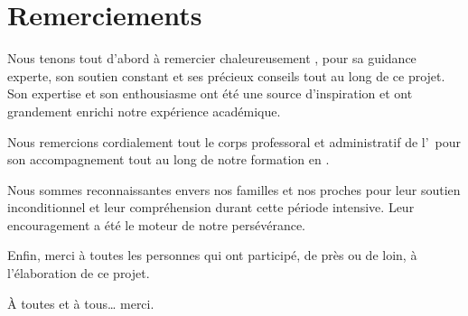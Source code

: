 \chapter*{Remerciements}

Nous tenons tout d'abord à remercier chaleureusement \encadrante, pour sa guidance experte, son soutien constant et ses précieux conseils tout au long de ce projet. Son expertise et son enthousiasme ont été une source d'inspiration et ont grandement enrichi notre expérience académique.

Nous remercions cordialement tout le corps professoral et administratif de l'\ecole\ pour son accompagnement tout au long de notre formation en \filiere.

Nous sommes reconnaissantes envers nos familles et nos proches pour leur soutien inconditionnel et leur compréhension durant cette période intensive. Leur encouragement a été le moteur de notre persévérance.

Enfin, merci à toutes les personnes qui ont participé, de près ou de loin, à l'élaboration de ce projet.

\vspace{1cm}
\begin{flushright}
    À toutes et à tous… merci.
\end{flushright}
